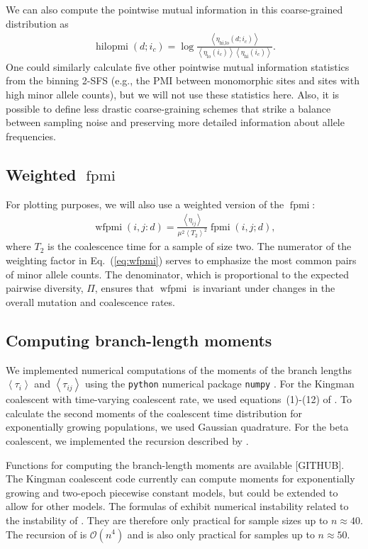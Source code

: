 \documentclass[11pt, letterpaper]{article}   	%
\newcommand{\eq}[1]{Eq.~(\ref{#1})}
\newcommand{\E}[1]{\left< #1 \right>}
\DeclareMathOperator{\fpmi}{fpmi}
\DeclareMathOperator{\wfpmi}{wfpmi}
\DeclareMathOperator{\hilopmi}{hilopmi}
\begin{document}
We can also compute the pointwise mutual information in this coarse-grained distribution as
\begin{align}
    \hilopmi(d; i_c) = \log \frac
                                {\E{\eta_{\text{hi,lo}}(d; i_c)}}
                                {\E{\eta_{\text{lo}}(i_c)}  \E{\eta_{\text{hi}}(i_c)}}.
\end{align}
One could similarly calculate five other pointwise mutual information statistics from the binning 2-SFS (e.g., the PMI between monomorphic sites and sites with high minor allele counts), but we will not use these statistics here.
Also, it is possible to define less drastic coarse-graining schemes that strike a balance between sampling noise and preserving more detailed information about allele frequencies.

\subsection*{Weighted $\fpmi$}
For plotting purposes, we will also use a weighted version of the $\fpmi$:
\begin{align}
    \wfpmi(i,j:d) = \frac{\E{\eta_{ij}}}{\mu^2 \E{T_2}^2} \fpmi(i,j;d),
    \label{eq:wfpmi}
\end{align}
where $T_2$ is the coalescence time for a sample of size two.
The numerator of the weighting factor in \eq{eq:wfpmi} serves to emphasize the most common pairs of minor allele counts.
The denominator, which is proportional to the expected pairwise diversity, $\Pi$, ensures that $\wfpmi$ is invariant under changes in the overall mutation and coalescence rates.

\subsection*{Computing branch-length moments}

We implemented numerical computations of the moments of the branch lengths $\E{\tau_i}$ and $\E{\tau_{ij}}$ using the \texttt{python} numerical package \texttt{numpy} \autocite{numpy}.
For the Kingman coalescent with time-varying coalescent rate, we used equations~(1)-(12) of \cite{ZivkovicWiehe2008}.
To calculate the second moments of the coalescent time distribution for exponentially growing populations, we used Gaussian quadrature.
For the beta coalescent, we implemented the recursion described by \cite{BirknerEtAl2013}.

Functions for computing the branch-length moments are available [GITHUB].
The Kingman coalescent code currently can compute moments for exponentially growing and two-epoch piecewise constant models, but could be extended to allow for other models.
The formulas of \cite{ZivkovicWiehe2008} exhibit numerical instability related to the instability of \cite{GriffithsTavare1994}.
They are therefore only practical for sample sizes up to $n \approx 40$.
The recursion of \cite{BirknerEtAl2013} is $\mathcal{O}(n^4)$ and is also only practical for samples up to $n \approx 50$.
\end{document}

